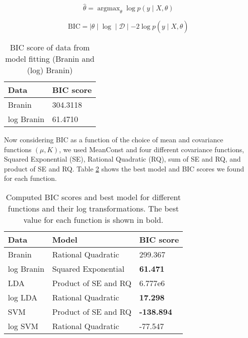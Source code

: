 \documentclass[11pt]{article}
\newcommand{\mc}[1]{\mathcal{#1}}
\newcommand{\data}{\mc{D}}
\DeclareMathOperator*{\argmax}{\arg\max}
\numberwithin{equation}{section}
\begin{document}
\begin{equation}
  \hat \theta = \argmax_\theta \log p(y \mid X, \theta)
  \label{eq:hyperparameter-estimate}
\end{equation}

\begin{equation}
  \text{BIC} = \mid \theta \mid \log \mid \data \mid - 2 \log p(y \mid X, \hat \theta)
  \label{eq:bic}
\end{equation}

\begin{table}[H]
  \centering
  \begin{tabular}{| l | l |}
    \hline
    Data       & BIC score \\
    \hline
    Branin     & 304.3118  \\
    \hline
    log Branin & 61.4710   \\
    \hline
  \end{tabular}
  \caption{BIC score of data from model fitting (Branin and (log) Branin)}
  \label{tab:basic_bic}
\end{table}

Now considering BIC as a function of the choice of mean and covariance functions $(\mu, K)$, we used MeanConst and four different covariance functions, Squared Exponential (SE), Rational Quadratic (RQ), sum of SE and RQ, and product of SE and RQ. Table \ref{tab:bic_score} shows the best model and BIC scores we found for each function.

\begin{table}[H]
  \centering
  \begin{tabular}{| l | l | l |}
    \hline
    Data       & Model                & BIC score \\
    \hline
    Branin     & Rational Quadratic   & 299.367   \\
    \hline
    log Branin & Squared Exponential  & \textbf{61.471}    \\
    \hline
    LDA        & Product of SE and RQ & 6.777e6 \\
    \hline
    log LDA    & Rational Quadratic   & \textbf{17.298}    \\
    \hline
    SVM        & Product of SE and RQ & \textbf{-138.894}  \\
    \hline
    log SVM    & Rational Quadratic   & -77.547   \\
    \hline
  \end{tabular}
  \caption{Computed BIC scores and best model for different functions and their log transformations. The best value for each function is shown in bold.}
  \label{tab:bic_score}
\end{table}
\end{document}
